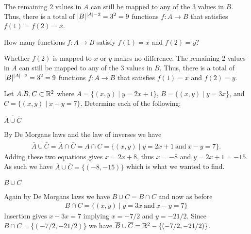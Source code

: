 \documentclass[a4paper, english, 12pt]{article} %
\begin{document}
\begin{answer}
  The remaining $2$ values in $A$ can still be mapped to any of the $3$ values
  in $B$. Thus, there is a total of $\lvert B\rvert^{\lvert A\rvert-2} = 3^2 = 9$ functions
  $f \colon A \to B$ that satisfies $f(1) = f(2) = x$.
\end{answer}

\begin{subproblem}
  How many functions $f \colon A \to B$ satisfy $f(1) = x$ and $f(2) = y$?
\end{subproblem}

\begin{answer}
  Whether $f(2)$ is mapped to $x$ or $y$ makes no difference. 
  The remaining $2$ values in $A$ can still be mapped to any of the $3$ values
  in $B$. Thus, there is a total of $\lvert B\rvert^{\lvert A\rvert-2} = 3^2 = 9$ functions
  $f \colon A \to B$ that satisfies $f(1) = x$ and $f(2) = y$.
\end{answer}

\begin{problem}[5]
  Let $A. B, C \subset \mathbb{R}^2$ where $A = \{(x,y) \mid y = 2x + 1\}$, $B = \{(x,y)
  \mid y = 3x\}$, and $C = \{(x, y) \mid x - y = 7\}$. Determine each of the following:
\end{problem}

\begin{subproblem}[3]
  $\overline{\overline{A} \cup \overline{C}}$
\end{subproblem}

\begin{answer}
  By De Morgans laws and the law of inverses we have
  \begin{align*}
      \overline{\overline{A} \cup \overline{C}}
    = \overline{\overline{A}} \cap \overline{\overline{C}}
    = A \cap C 
    = \{(x,y) \mid y = 2x + 1 \ \text{and} \ x - y  = 7 \}.
  \end{align*}
  Adding these two equations gives $x = 2x + 8$, thus $x=-8$ and $y=2x+1=-15$.
  As such we have $\overline{\overline{A} \cup \overline{C}} = \{(-8, -15)\}$
  which is what we wanted to find.
\end{answer}

\begin{subproblem}
  $\overline{B} \cup \overline{C}$
\end{subproblem}

\begin{answer}
  Again by De Morgans laws we have
  $\overline{B} \cup \overline{C} = \overline{B \cap C}$ and now as before
  \begin{align*}
    B \cap C = \{(x,y) \mid y = 3x \ \text{and} \ x - y = 7\}
  \end{align*}
  Insertion gives $x - 3x=7$ implying $x=-7/2$ and $y=-21/2$. Since $B \cap C =
  \{(-7/2,-21/2)\}$
  we have $\overline{B} \cup \overline{C} = \mathbb{R}^2 - \{(-7/2,-21/2)\}$.
\end{answer}
\end{document}
